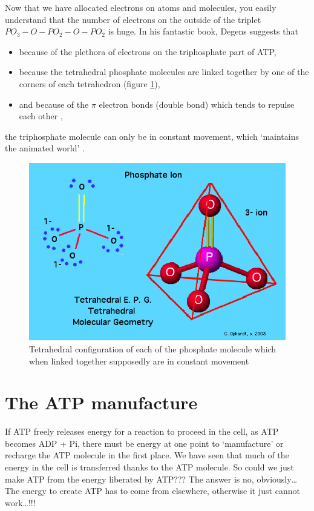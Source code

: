 \documentclass[]{book}
\providecommand{\tightlist}{%
  \setlength{\itemsep}{0pt}\setlength{\parskip}{0pt}}
\theoremstyle{definition}
\theoremstyle{definition}
\theoremstyle{definition}
\theoremstyle{remark}
\begin{document}
Now that we have allocated electrons on atoms and molecules, you easily
understand that the number of electrons on the outside of the triplet
\(PO_3-O-PO_2-O-PO_2\) is huge. In his fantastic book, Degens
\citeyearpar{Degens1989-ip} suggests that

\begin{itemize}
\tightlist
\item
  because of the plethora of electrons on the triphosphate part of ATP,
\item
  because the tetrahedral phosphate molecules are linked together by one
  of the corners of each tetrahedron (figure \ref{fig:PO4tetrahedra}),
\item
  and because of the \(\pi\) electron bonds (double bond) which tends to
  repulse each other \citep{Degens1989-ip},
\end{itemize}

the triphosphate molecule can only be in constant movement, which
`maintains the animated world' \citep{Degens1989-ip}.

\begin{figure}

{\centering \includegraphics[width=0.6\linewidth]{pictures/204phosphate} 

}

\caption{Tetrahedral configuration of each of the phosphate molecule which when linked together supposedly are in constant movement}\label{fig:PO4tetrahedra}
\end{figure}

\section{The ATP manufacture}\label{the-atp-manufacture}

If ATP freely releases energy for a reaction to proceed in the cell, as
ATP becomes ADP + Pi, there must be energy at one point to `manufacture'
or recharge the ATP molecule in the first place. We have seen that much
of the energy in the cell is transferred thanks to the ATP molecule. So
could we just make ATP from the energy liberated by ATP??? The answer is
no, obviously\ldots{} The energy to create ATP has to come from
elsewhere, otherwise it just cannot work\ldots{}!!!
\end{document}
